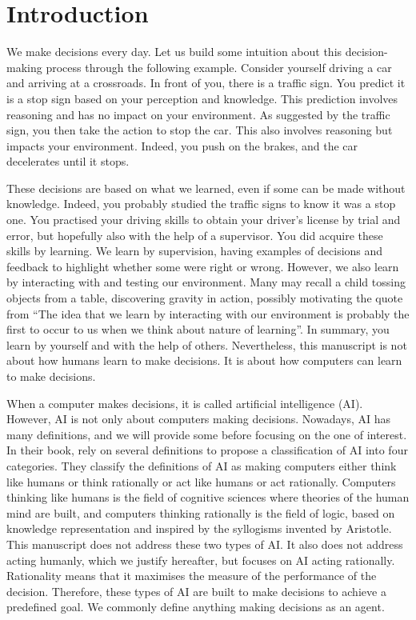 \chapter{Introduction}\label{ch:introduction}

We make decisions every day.
Let us build some intuition about this decision-making process through the following example.
Consider yourself driving a car and arriving at a crossroads.
In front of you, there is a traffic sign.
You predict it is a stop sign based on your perception and knowledge.
This prediction involves reasoning and has no impact on your environment.
As suggested by the traffic sign, you then take the action to stop the car.
This also involves reasoning but impacts your environment.
Indeed, you push on the brakes, and the car decelerates until it stops.

These decisions are based on what we learned, even if some can be made without knowledge.
Indeed, you probably studied the traffic signs to know it was a stop one.
You practised your driving skills to obtain your driver's license by trial and error, but hopefully also with the help of a supervisor.
You did acquire these skills by learning.
We learn by supervision, having examples of decisions and feedback to highlight whether some were right or wrong.
However, we also learn by interacting with and testing our environment.
Many may recall a child tossing objects from a table, discovering gravity in action, possibly motivating the quote from \cite{sutton2018reinforcement} ``The idea that we learn by interacting with our environment is probably the first to occur to us when we think about nature of learning''.
In summary, you learn by yourself and with the help of others.
Nevertheless, this manuscript is not about how humans learn to make decisions.
It is about how computers can learn to make decisions.

When a computer makes decisions, it is called artificial intelligence (AI).
However, AI is not only about computers making decisions.
Nowadays, AI has many definitions, and we will provide some before focusing on the one of interest.
In their book, \cite{russel2010} rely on several definitions to propose a classification of AI into four categories.
They classify the definitions of AI as making computers either think like humans or think rationally or act like humans or act rationally.
Computers thinking like humans is the field of cognitive sciences where theories of the human mind are built, and computers thinking rationally is the field of logic, based on knowledge representation and inspired by the syllogisms invented by Aristotle.
This manuscript does not address these two types of AI.
It also does not address acting humanly, which we justify hereafter, but focuses on AI acting rationally.
Rationality means that it maximises the measure of the performance of the decision.
Therefore, these types of AI are built to make decisions to achieve a predefined goal.
We commonly define anything making decisions as an agent.

